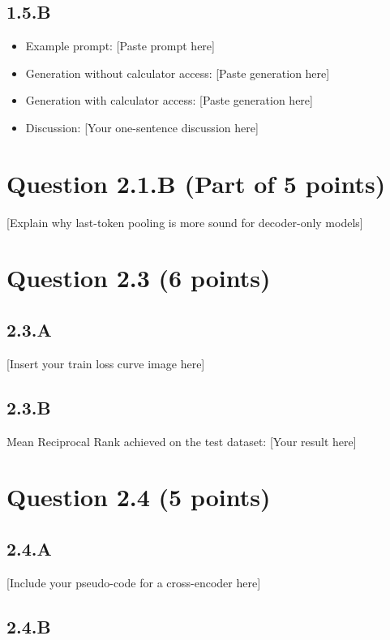 \documentclass{article}
\begin{document}
\subsection*{1.5.B}

\begin{itemize}
    \item Example prompt: [Paste prompt here]
    \item Generation without calculator access: [Paste generation here]
    \item Generation with calculator access: [Paste generation here]
    \item Discussion: [Your one-sentence discussion here]
\end{itemize}

\section*{Question 2.1.B (Part of 5 points)}

[Explain why last-token pooling is more sound for decoder-only models]

\section*{Question 2.3 (6 points)}

\subsection*{2.3.A}

[Insert your train loss curve image here]

\subsection*{2.3.B}

Mean Reciprocal Rank achieved on the test dataset: [Your result here]

\section*{Question 2.4 (5 points)}

\subsection*{2.4.A}

[Include your pseudo-code for a cross-encoder here]

\subsection*{2.4.B}
\end{document}
